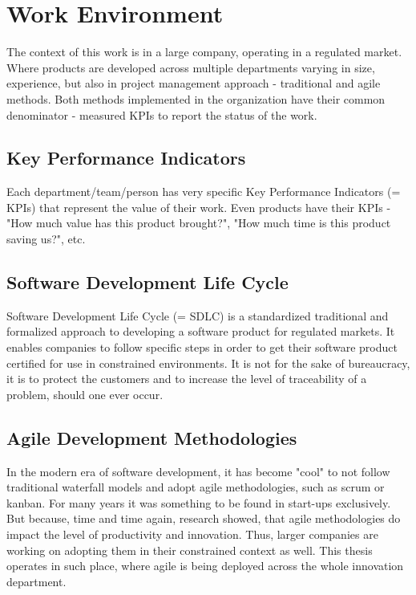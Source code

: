 \newpage

\section{Work Environment}

The context of this work is in a large company, operating in a regulated market. Where products are developed across multiple departments varying in size, experience, but also in project management approach - traditional and agile methods. Both methods implemented in the organization have their common denominator - measured KPIs to report the status of the work.

\subsection{Key Performance Indicators}

Each department/team/person has very specific Key Performance Indicators (= KPIs) that represent the value of their work. Even products have their KPIs - "How much value has this product brought?", "How much time is this product saving us?", etc.

\subsection{Software Development Life Cycle}

Software Development Life Cycle (= SDLC) is a standardized traditional and formalized approach to developing a software product for regulated markets. It enables companies to follow specific steps in order to get their software product certified for use in constrained environments. It is not for the sake of bureaucracy, it is to protect the customers and to increase the level of traceability of a problem, should one ever occur.

\subsection{Agile Development Methodologies}

In the modern era of software development, it has become "cool" to not follow traditional waterfall models and adopt agile methodologies, such as scrum or kanban. For many years it was something to be found in start-ups exclusively. But because, time and time again, research \cite{947100} showed, that agile methodologies do impact the level of productivity and innovation. Thus, larger companies are working on adopting them in their constrained context as well. This thesis operates in such place, where agile is being deployed across the whole innovation department.


